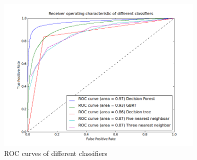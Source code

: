 \documentclass[ %
                    author={Sam Phippen},
                supervisor={Dr. Rafal Bogacz},
                     title={Real time voice activity detectors in noisy personal computing environments},
                  subtitle={},
                    degree={MEng},
                      year={2012} ]{thesis}
\begin{document}
\begin{figure}
    \label{fig:multiclass-roc}
    \includegraphics[width=10cm]{roc_different.png}
    \caption{ROC curves of different classifiers}
\end{figure}
\end{document}
